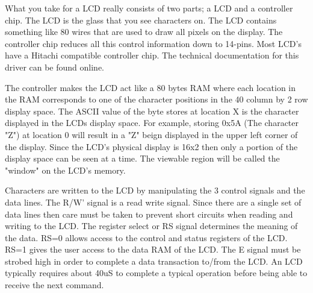                             What you take for a LCD really consists of two parts; a LCD and a controller
                            chip.   The LCD is the glass that you see
                            characters on. The LCD contains something like 80 wires that are used
                            to draw all pixels on the display. The
                            controller chip reduces all this control information down to 14-pins.
                            Most LCD's have a Hitachi compatible controller chip. The technical
                            documentation for this driver can be found online.

                            The controller makes the LCD act like a 80 bytes RAM where each location
                            in the RAM corresponds to one of the character positions in the 40 column
                            by 2 row display space.  The ASCII value of the byte stores at location X
                            is the character displayed in the LCDs display space.  For example, storing
                            0x5A (The character "Z") at location 0 will result in a "Z" beign displayed
                            in the upper left corner of the display.  Since the LCD's physical display
                            is 16x2 then only a portion of the display space can be seen at a time. The
                            viewable region will be called the "window" on the LCD's memory.

                            Characters are written to the LCD by manipulating the 3 control signals and
                            the data lines.  The R/W' signal is a read write signal.  Since there are
                            a single set of data lines then care must be taken to prevent short circuits
                            when reading and writing to the LCD.  The register select or RS signal
                            determines the meaning of the data.  RS=0 allows access to the control and
                            status registers of the LCD.  RS=1 gives the user access to the data RAM
                            of the LCD.  The E signal must be strobed high in order to complete a
                            data transaction to/from the LCD.  An LCD typically requires about 40uS
                            to complete a typical operation before being able to receive the next
                            command.

